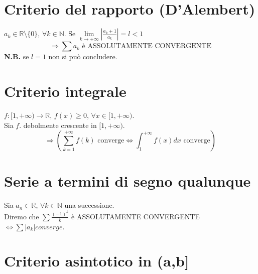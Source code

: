 \documentclass{article}
\newcommand{\R}{\mathbb{R}}
\newcommand{\N}{\mathbb{N}}
\begin{document}
\begin{flushleft}
\section{Criterio del rapporto (D'Alembert)}
$a_k \in \R \setminus \{0\}$, $\forall k \in \N$. Se $\lim\limits_{k \to + \infty} \left|\frac{a_k+1}{a_k}\right| = l < 1$
\[
\Rightarrow \sum a_k \text{ è ASSOLUTAMENTE CONVERGENTE}
\]
\textbf{N.B.} se $l=1$ non si può concludere.

\section{Criterio integrale}
$f:[1, +\infty) \rightarrow \R$, $f(x) \geq 0$, $\forall x \in [1, +\infty)$.\\
Sia $f$. debolmente crescente in $[1, + \infty)$.
\[
\Rightarrow (\sum_{k = 1}^{+ \infty}f(k) \text{ converge} \iff \int_{1}^{+ \infty}f(x)dx \text{ converge})
\]

\section{Serie a termini di segno qualunque}
Sia $a_n \in \R$, $\forall k \in \N$ una successione.\\
Diremo che $\sum \frac{(-1)^k}{k}$ è ASSOLUTAMENTE CONVERGENTE $\iff \sum \left|a_k\right| converge$.

\section{Criterio asintotico in (a,b]}

\end{flushleft}
\end{document}
